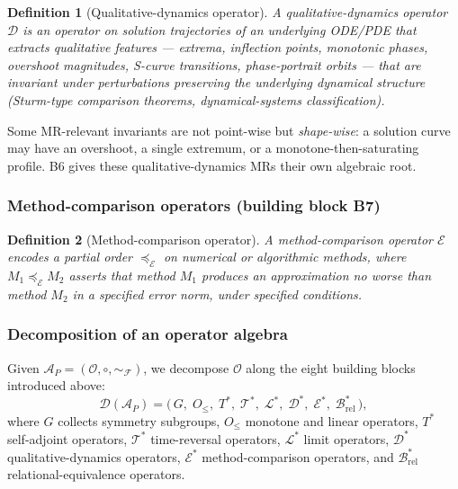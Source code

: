 \documentclass[acmsmall, screen]{acmart}
\newtheorem{definition}{Definition}
\begin{document}
\begin{definition}[Qualitative-dynamics operator]
A \emph{qualitative-dynamics operator} $\mathcal{D}$ is an operator on solution trajectories of an underlying ODE/PDE that extracts qualitative features --- extrema, inflection points, monotonic phases, overshoot magnitudes, S-curve transitions, phase-portrait orbits --- that are invariant under perturbations preserving the underlying dynamical structure (Sturm-type comparison theorems, dynamical-systems classification).
\end{definition}

Some MR-relevant invariants are not point-wise but \emph{shape-wise}: a solution curve may have an overshoot, a single extremum, or a monotone-then-saturating profile. B6 gives these qualitative-dynamics MRs their own algebraic root.

\subsubsection{Method-comparison operators (building block B7)}

\begin{definition}[Method-comparison operator]
A \emph{method-comparison operator} $\mathcal{E}$ encodes a partial order $\preceq_{\mathcal{E}}$ on numerical or algorithmic methods, where $M_1 \preceq_{\mathcal{E}} M_2$ asserts that method $M_1$ produces an approximation no worse than method $M_2$ in a specified error norm, under specified conditions.
\end{definition}

\subsubsection{Decomposition of an operator algebra}
\label{subsec:decomposition}

Given $\mathcal{A}_P = (\mathcal{O}, \circ, \sim_{\mathcal{F}})$, we decompose $\mathcal{O}$ along the eight building blocks introduced above:
$$\mathcal{D}(\mathcal{A}_P) = \bigl(\,G,\; O_{\le},\; T^{*},\; \mathcal{T}^{*},\; \mathcal{L}^{*},\; \mathcal{D}^{*},\; \mathcal{E}^{*},\; \mathcal{B}^{*}_{\mathrm{rel}}\,\bigr),$$
where $G$ collects symmetry subgroups, $O_{\le}$ monotone and linear operators, $T^{*}$ self-adjoint operators, $\mathcal{T}^{*}$ time-reversal operators, $\mathcal{L}^{*}$ limit operators, $\mathcal{D}^{*}$ qualitative-dynamics operators, $\mathcal{E}^{*}$ method-comparison operators, and $\mathcal{B}^{*}_{\mathrm{rel}}$ relational-equivalence operators.
\end{document}
